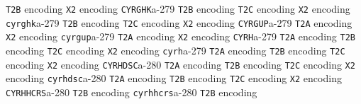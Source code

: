 \documentclass[twoside]{ltxdoc}
\makeatletter
\renewenvironment{theindex}{%
   \@restonecoltrue
   \if@twocolumn\@restonecolfalse\fi
   \columnseprule \z@
   \columnsep 35\p@
   \twocolumn[\index@prologue]%
   \IndexParms
   \let\item\@idxitem
   \ignorespaces
}{\if@restonecol\onecolumn\else\clearpage\fi}
\makeatother
\begin{document}
\begin{theindex}
    \subitem \texttt  {T2B} encoding\pfill {}
    \subitem \texttt  {X2} encoding\pfill {}
  \item \texttt  {CYRGHK}\pfill a-279
    \subitem \texttt  {T2B} encoding\pfill {}
    \subitem \texttt  {T2C} encoding\pfill {}
    \subitem \texttt  {X2} encoding\pfill {}
  \item \texttt  {cyrghk}\pfill a-279
    \subitem \texttt  {T2B} encoding\pfill {}
    \subitem \texttt  {T2C} encoding\pfill {}
    \subitem \texttt  {X2} encoding\pfill {}
  \item \texttt  {CYRGUP}\pfill a-279
    \subitem \texttt  {T2A} encoding\pfill {}
    \subitem \texttt  {X2} encoding\pfill {}
  \item \texttt  {cyrgup}\pfill a-279
    \subitem \texttt  {T2A} encoding\pfill {}
    \subitem \texttt  {X2} encoding\pfill {}
  \item \texttt  {CYRH}\pfill a-279
    \subitem \texttt  {T2A} encoding\pfill {}
    \subitem \texttt  {T2B} encoding\pfill {}
    \subitem \texttt  {T2C} encoding\pfill {}
    \subitem \texttt  {X2} encoding\pfill {}
  \item \texttt  {cyrh}\pfill a-279
    \subitem \texttt  {T2A} encoding\pfill {}
    \subitem \texttt  {T2B} encoding\pfill {}
    \subitem \texttt  {T2C} encoding\pfill {}
    \subitem \texttt  {X2} encoding\pfill {}
  \item \texttt  {CYRHDSC}\pfill a-280
    \subitem \texttt  {T2A} encoding\pfill {}
    \subitem \texttt  {T2B} encoding\pfill {}
    \subitem \texttt  {T2C} encoding\pfill {}
    \subitem \texttt  {X2} encoding\pfill {}
  \item \texttt  {cyrhdsc}\pfill a-280
    \subitem \texttt  {T2A} encoding\pfill {}
    \subitem \texttt  {T2B} encoding\pfill {}
    \subitem \texttt  {T2C} encoding\pfill {}
    \subitem \texttt  {X2} encoding\pfill {}
  \item \texttt  {CYRHHCRS}\pfill a-280
    \subitem \texttt  {T2B} encoding\pfill {}
  \item \texttt  {cyrhhcrs}\pfill a-280
    \subitem \texttt  {T2B} encoding\pfill {}

\end{theindex}
\end{document}
